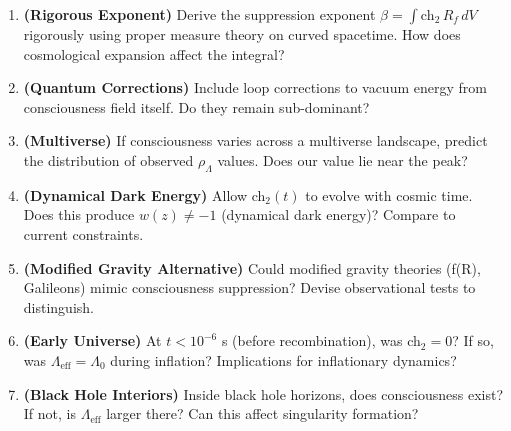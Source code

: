 \begin{enumerate}
\item \textbf{(Rigorous Exponent)} Derive the suppression exponent $\beta = \int \text{ch}_2 \, R_f \, dV$ rigorously using proper measure theory on curved spacetime. How does cosmological expansion affect the integral?

\item \textbf{(Quantum Corrections)} Include loop corrections to vacuum energy from consciousness field itself. Do they remain sub-dominant?

\item \textbf{(Multiverse)} If consciousness varies across a multiverse landscape, predict the distribution of observed $\rho_\Lambda$ values. Does our value lie near the peak?

\item \textbf{(Dynamical Dark Energy)} Allow ch$_2(t)$ to evolve with cosmic time. Does this produce $w(z) \neq -1$ (dynamical dark energy)? Compare to current constraints.

\item \textbf{(Modified Gravity Alternative)} Could modified gravity theories (f(R), Galileons) mimic consciousness suppression? Devise observational tests to distinguish.

\item \textbf{(Early Universe)} At $t < 10^{-6}$ s (before recombination), was ch$_2 = 0$? If so, was $\Lambda_{\text{eff}} = \Lambda_0$ during inflation? Implications for inflationary dynamics?

\item \textbf{(Black Hole Interiors)} Inside black hole horizons, does consciousness exist? If not, is $\Lambda_{\text{eff}}$ larger there? Can this affect singularity formation?
\end{enumerate}
